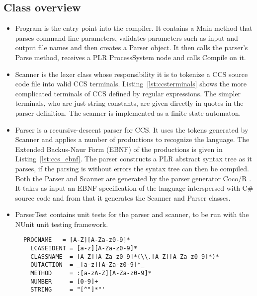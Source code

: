 \subsection{Class overview}
	\begin{itemize}
	
	\item \textsf{Program} is the entry point into the compiler. It contains a 
	\textsf{Main} method that parses command line parameters, validates 
	parameters such as input and output file names and then creates a 
	\textsf{Parser} object. It then calls the parser's \textsf{Parse} method, 
	receives a PLR \textsf{ProcessSystem} node and calls \textsf{Compile} on it. 
	
	\item \textsf{Scanner} is the lexer class whose responsibility it is to 
	tokenize a CCS source code file into valid CCS terminals. 
	Listing~\ref{lst:ccsterminals} shows the more complicated terminals of CCS 
	defined by regular expressions. The simpler terminals, who are just string 
	constants, are given directly in quotes in the parser definition. The 
	scanner is implemented as a finite state automaton.
	
  \item \textsf{Parser} is a recursive-descent parser for CCS. It uses the 
  tokens generated by \textsf{Scanner} and applies a number of 
  \textsf{productions} to recognize the language. The Extended Backus-Naur 
  Form (EBNF) of the productions is given in Listing~\ref{lst:ccs_ebnf}. The 
  parser constructs a PLR abstract syntax tree as it parses, if the parsing is 
  without errors the syntax tree can then be compiled. Both the 
  \textsf{Parser} and \textsf{Scanner} are generated by the parser generator 
  Coco/R \cite{cocor}. It takes as input an EBNF specification of the language 
  interspersed with C\# source code and from that it generates the 
  \textsf{Scanner} and \textsf{Parser} classes. 
	
	\item \textsf{ParserTest} contains unit tests for the parser and scanner, to 
	be run with the NUnit unit testing framework.
	
	\end{itemize}
	\begin{figure}
\lstset{showtabs=false,showspaces=false,showstringspaces=false}
\begin{lstlisting}[caption=Terminals of CCS scanner,label=lst:ccsterminals,frame=trbl,basicstyle=\scriptsize\ttfamily,showtabs=false,showspaces=false]
  PROCNAME   = [A-Z][A-Za-z0-9]*
  LCASEIDENT = [a-z][A-Za-z0-9]*
  CLASSNAME  = [A-Z][A-Za-z0-9]*(\\.[A-Z][A-Za-z0-9]*)*
  OUTACTION  = _[a-z][A-Za-z0-9]*_
  METHOD     = :[a-zA-Z][A-Za-z0-9]*
  NUMBER     = [0-9]+
  STRING     = "[^"]*"'
  \end{lstlisting}
	\end{figure}
	

